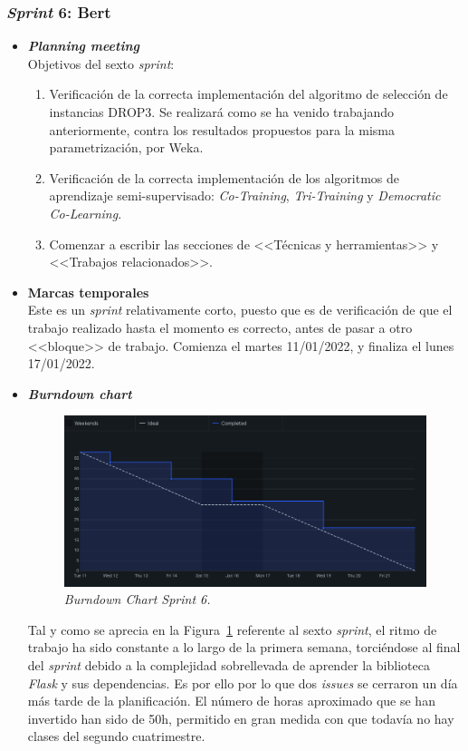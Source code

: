 \subsubsection{\textit{Sprint} 6: Bert}
\begin{itemize}
\item \textbf{\textit{Planning meeting}}\\
Objetivos del sexto \textit{sprint}:
\begin{enumerate}
\item Verificación de la correcta implementación del algoritmo de selección de instancias DROP3. Se realizará como se ha venido trabajando anteriormente, contra los resultados propuestos para la misma parametrización, por Weka.
\item Verificación de la correcta implementación de los algoritmos de aprendizaje semi-supervisado: \textit{Co-Training}, \textit{Tri-Training} y \textit{Democratic Co-Learning}.
\item Comenzar a escribir las secciones de <<Técnicas y herramientas>> y <<Trabajos relacionados>>.
\end{enumerate}

\item \textbf{Marcas temporales}\\
Este es un \textit{sprint} relativamente corto, puesto que es de verificación de que el trabajo realizado hasta el momento es correcto, antes de pasar a otro <<bloque>> de trabajo. Comienza el martes 11/01/2022, y finaliza el lunes 17/01/2022.

\item \textbf{\textit{Burndown chart}}\\
\begin{figure}
\begin{center}
\includegraphics[width=\textwidth]{../img/anexos/sprints/BD-Sprint6}
\caption{\textit{Burndown Chart Sprint 6.}}\label{fig:BD-Sprint6}
\end{center}
\end{figure}
Tal y como se aprecia en la Figura~\ref{fig:BD-Sprint6} referente al sexto \textit{sprint}, el ritmo de trabajo ha sido constante a lo largo de la primera semana, torciéndose al final del \textit{sprint} debido a la complejidad sobrellevada de aprender la biblioteca \textit{Flask} y sus dependencias. Es por ello por lo que dos \textit{issues} se cerraron un día más tarde de la planificación.
El número de horas aproximado que se han invertido han sido de 50h, permitido en gran medida con que todavía no hay clases del segundo cuatrimestre.


\end{itemize}
